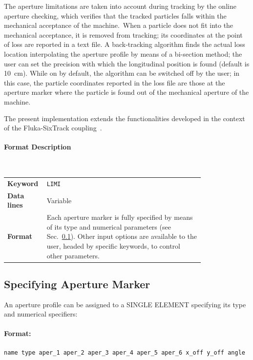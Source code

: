 The aperture limitations are taken into account during tracking by the online aperture checking, which verifies that the tracked particles falls within the mechanical acceptance of the machine.\
When a particle does not fit into the mechanical acceptance, it is removed from tracking; its coordinates at the point of loss are reported in a text file.
A back-tracking algorithm finds the actual loss location interpolating the aperture profile by means of a bi-section method; the user can set the precision with which the longitudinal position is found (default is 10~cm).
While on by default, the algorithm can be switched off by the user; in this case, the particle coordinates reported in the loss file are those at the aperture marker where the particle is found out of the mechanical aperture of the machine.

The present implementation extends the functionalities developed in the context of the Fluka-SixTrack coupling~\cite{coupling:1,coupling:2}.

\paragraph{Format Description}~

\bigskip
\begin{tabular}{@{}lp{0.8\linewidth}}
    \textbf{Keyword}    & \texttt{LIMI}\index{LIMI} \\
    \textbf{Data lines} & Variable \\
    \textbf{Format}     & Each aperture marker is fully specified by means of its type and
                          numerical parameters (see Sec.~\ref{ApeLim:ApeSpecs}).
                          Other input options are available to the user,
                          headed by specific keywords, to control other parameters.
\end{tabular}

\bigskip
\subsection{Specifying Aperture Marker}\label{ApeLim:ApeSpecs}
An aperture profile can be assigned to a SINGLE ELEMENT specifying its type and numerical specifiers:

\paragraph{Format:}
\texttt{name type aper\_1 aper\_2 aper\_3 aper\_4 aper\_5 aper\_6 x\_off y\_off angle}

